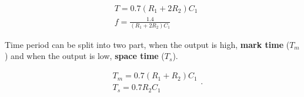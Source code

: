 \documentclass[12pt]{article}
\begin{document}
\begin{equation*}
	\begin{split}
		&T = 0.7 (R_1 + 2 R_2) C_1 \\
		&f = \frac{1.4}{(R_1 + 2 R_2) C_1}
	\end{split}
	\end{equation*}

Time period can be split into two part, when the output is high, \textbf{mark time} ($T_m$) and when the output is low,  \textbf{space time} ($T_s$).

\begin{equation*}
	\begin{split}
		&T_m = 0.7 (R_1 + R_2) C_1 \\
		&T_s = 0.7 R_2 C_1
	\end{split}.
\end{equation*}

\end{document}
